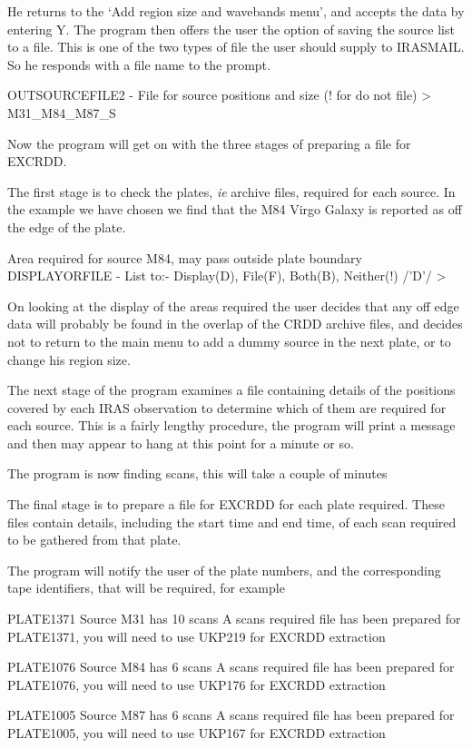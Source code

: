 \documentclass[twoside,11pt]{starlink}
\begin{document}
He returns to the `Add region size and wavebands menu', and accepts the data by
entering Y. The program then offers the user the option of saving the source
list to a file. This is one of the two types of file the user should supply to
IRASMAIL. So he responds with a file name to the prompt.

\begin{terminalv}
OUTSOURCEFILE2 - File for source positions and size (! for do not file) >
M31_M84_M87_S
\end{terminalv}

Now the program will get on with the three stages of preparing a file for
EXCRDD.

The first stage is to check the plates, \textit{ie} archive files, required for
each source. In the example we have chosen we find that the M84 Virgo Galaxy is
reported as off the edge of the plate.

\begin{terminalv}
 Area required for source M84, may pass outside plate boundary
DISPLAYORFILE - List to:- Display(D), File(F), Both(B), Neither(!) /'D'/ >
\end{terminalv}

On looking at the display of the areas required the user decides that any
off edge data will probably be found in the overlap of the CRDD archive files,
and decides not to return to the main menu to add a dummy source in the
next plate, or to change his region size.

The next stage of the program examines a file containing details of the
positions covered by each IRAS observation to determine which of them are
required for each source. This is a fairly lengthy procedure, the program will
print a message and then may appear to hang at this point for a minute or so.

\begin{terminalv}
 The program is now finding scans, this will take a couple of minutes
\end{terminalv}

The final stage is to prepare a file for EXCRDD for each plate required. These
files contain details, including the start time and end time, of each scan
required to be gathered from that plate.

The program will notify the user of the plate numbers, and the corresponding
tape identifiers, that will be required, for example

\begin{terminalv}
PLATE1371
Source M31 has  10 scans
A scans required file has been prepared for PLATE1371, you will need to use
UKP219 for EXCRDD extraction

PLATE1076
Source M84 has   6 scans
A scans required file has been prepared for PLATE1076, you will need to use
UKP176 for EXCRDD extraction

PLATE1005
Source M87 has   6 scans
A scans required file has been prepared for PLATE1005, you will need to use
UKP167 for EXCRDD extraction
\end{terminalv}
\end{document}
